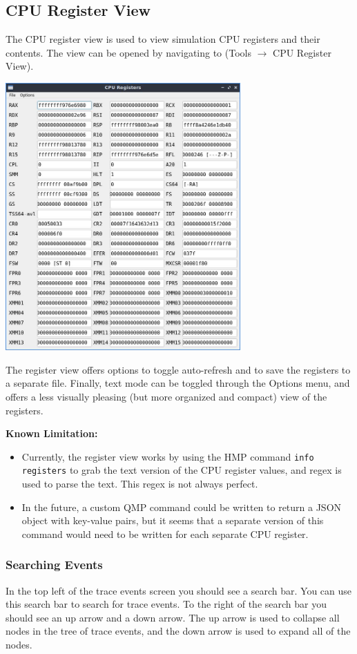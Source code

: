 \documentclass{article}
\newcommand{\code}[1]{\texttt{#1}}
\begin{document}
\subsection{CPU Register View}
The CPU register view is used to view simulation CPU registers and their contents. The view can be opened by navigating to (Tools $\rightarrow$ CPU Register View). 

\begin{center}
    \includegraphics[width=90mm]{images/registers_fancy.jpg}
\end{center}

The register view offers options to toggle auto-refresh and to save the registers to a separate file. Finally, text mode can be toggled through the Options menu, and offers a less visually pleasing (but more organized and compact) view of the registers. \newline

\textbf{Known Limitation:}
\begin{itemize}
    \item Currently, the register view works by using the HMP command \code{info registers} to grab the text version of the CPU register values, and regex is used to parse the text. This regex is not always perfect. 
    \item In the future, a custom QMP command could be written to return a JSON object with key-value pairs, but it seems that a separate version of this command would need to be written for each separate CPU register.
\end{itemize}

\subsubsection{Searching Events}
In the top left of the trace events screen you should see a search bar. You can use this search bar to search for trace events. To the right of the search bar you should see an up arrow and a down arrow. The up arrow is used to collapse all nodes in the tree of trace events, and the down arrow is used to expand all of the nodes. 
\newpage
\end{document}
